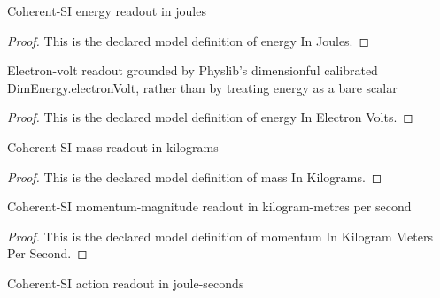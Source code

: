 \begin{definition}
  \label{def:physics:phyx-mini-0623:phyxminiproblems-problemphyxmini0623-energyinjoules}
  Coherent-SI energy readout in joules
\end{definition}
\begin{proof}
  This is the declared model definition of energy In Joules.
\end{proof}
\begin{definition}
  \label{def:physics:phyx-mini-0623:phyxminiproblems-problemphyxmini0623-energyinelectronvolts}
  Electron-volt readout grounded by Physlib's dimensionful calibrated DimEnergy.electronVolt, rather than by treating energy as a bare scalar
\end{definition}
\begin{proof}
  This is the declared model definition of energy In Electron Volts.
\end{proof}
\begin{definition}
  \label{def:physics:phyx-mini-0623:phyxminiproblems-problemphyxmini0623-massinkilograms}
  Coherent-SI mass readout in kilograms
\end{definition}
\begin{proof}
  This is the declared model definition of mass In Kilograms.
\end{proof}
\begin{definition}
  \label{def:physics:phyx-mini-0623:phyxminiproblems-problemphyxmini0623-momentuminkilogrammeterspersecond}
  Coherent-SI momentum-magnitude readout in kilogram-metres per second
\end{definition}
\begin{proof}
  This is the declared model definition of momentum In Kilogram Meters Per Second.
\end{proof}
\begin{definition}
  \label{def:physics:phyx-mini-0623:phyxminiproblems-problemphyxmini0623-actioninjouleseconds}
  Coherent-SI action readout in joule-seconds
\end{definition}
